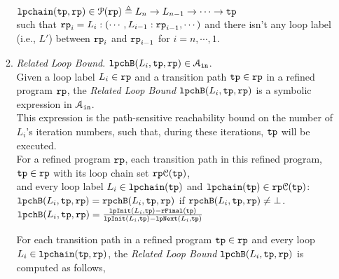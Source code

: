 \begin{enumerate}
\begin{enumerate}
\begin{defn}
$\mathtt{lpchain}(\mathtt{tp}, \mathtt{rp}) \in \mathcal{P}(\mathtt{rp}) \triangleq 
L_n \to L_{n-1} \to \cdots \to \mathtt{tp}$
\\
such that 
$\mathtt{rp}_{i}= L_i : (\cdots, L_{i - 1} : \mathtt{rp}_{i-1}, \cdots)$ and
 there isn't any loop label (i.e., $L'$) between $\mathtt{rp}_{i}$ and $\mathtt{rp}_{i - 1}$ for $i = n, \cdots, 1$.
\end{defn}
\item  \emph{Related Loop Bound}.
$\mathtt{lpchB}(L_i, \mathtt{tp}, \mathtt{rp}) \in \mathcal{A}_{\mathtt{in}}$.
\\
Given a loop label $L_i \in \mathtt{rp}$ and a transition path $\mathtt{tp} \in \mathtt{rp}$ in a refined program $\mathtt{rp}$,
the \emph{Related Loop Bound} $\mathtt{lpchB}(L_i, \mathtt{tp}, \mathtt{rp})$ is a symbolic expression in $\mathcal{A}_{\mathtt{in}}$.
\\
This expression is the path-sensitive
reachability bound on the number of $L_i$'s iteration numbers,
such that, during these iterations, $\mathtt{tp}$ will be executed. 
\\
For a refined program $\mathtt{rp}$, 
each transition path in this refined program, $\mathtt{tp} \in \mathtt{rp}$ with its loop chain set $\mathtt{rp}\mathcal{C}(\mathtt{tp})$,
\\
and every loop label $L_i \in \mathtt{lpchain}(\mathtt{tp}) $ and $\mathtt{lpchain}(\mathtt{tp})  \in \mathtt{rp}\mathcal{C}(\mathtt{tp})$:
\\
$\mathtt{lpchB}(L_i, \mathtt{tp}, \mathtt{rp}) = \mathtt{rpchB}(L_i, \mathtt{tp}, \mathtt{rp})$ if $\mathtt{rpchB}(L_i, \mathtt{tp}, \mathtt{rp}) \neq \bot$.
\\
$\mathtt{lpchB}(L_i, \mathtt{tp}, \mathtt{rp}) = 
\frac{\mathtt{lpInit}(L_i, \mathtt{tp}) - \mathtt{rFinal}(\mathtt{tp})}{\mathtt{lpInit}(L_i, \mathtt{tp}) - \mathtt{lpNext}(L_i, \mathtt{tp})}$
\begin{defn}
  \label{def:relatedloop_bound}
For each transition path in a refined program $\mathtt{tp} \in \mathtt{rp}$
and every loop $L_i \in \mathtt{lpchain}(\mathtt{tp}, \mathtt{rp})$,
the \emph{Related Loop Bound} $\mathtt{lpchB}(L_i, \mathtt{tp}, \mathtt{rp})$ is computed as follows,

\end{defn}
\end{enumerate}
\end{enumerate}
